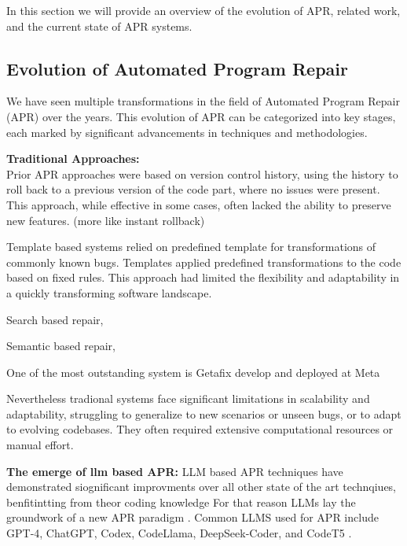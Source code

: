 In this section we will provide an overview of the evolution of APR, related work, and the current state of APR systems.

\subsection{Evolution of Automated Program Repair}
We have seen multiple transformations in the field of Automated Program Repair (APR) over the years. This evolution of APR can be categorized into key stages, each marked by significant advancements in techniques and methodologies.

\textbf{Traditional Approaches:}\\
Prior APR approaches were based on version control history, using the history to roll back to a previous version of the code part, where no issues were present. This approach, while effective in some cases, often lacked the ability to preserve new features. (more like instant rollback)

Template based systems relied on predefined template for transformations of commonly known bugs. Templates applied predefined transformations to the code based on fixed rules. This approach had limited the flexibility and adaptability in a quickly transforming software landscape. \cite{puvvadiCodingAgentsComprehensive2025}

Search based repair,

Semantic based repair,

One of the most outstanding system is Getafix develop and deployed at Meta \cite{baderGetafixLearningFix2019}

Nevertheless tradional systems face significant limitations in scalability and adaptability, struggling to generalize to new scenarios or unseen bugs, or to adapt to evolving codebases. They often required extensive computational resources or manual effort. \cite{puvvadiCodingAgentsComprehensive2025}


\textbf{The emerge of llm based APR:}
LLM based APR techniques have demonstrated siognificant improvments over all other state of the art technqiues, benfitintting from theor coding knowledge \cite{hossainDeepDiveLarge2024}For that reason LLMs lay the groundwork of a new APR paradigm \cite{chenUnveilingPitfallsUnderstanding2025}.
Common LLMS used for APR include GPT-4, ChatGPT, Codex, CodeLlama, DeepSeek-Coder, and CodeT5 \cite{houLargeLanguageModels2024, yinThinkRepairSelfDirectedAutomated2024,anandComprehensiveSurveyAIDriven2024}.

